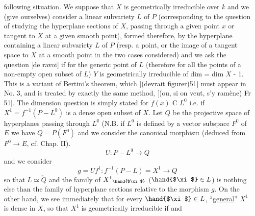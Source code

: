
following situation.  We suppose that $X$ is geometrically
irreducible over $k$ and we (give ourselves) consider a linear
subvariety $L$ of $P$ (corresponding to the question of studying the
hyperplane sections of $X$, passing through a given point $x$ or
tangent to $X$ at a given smooth point), formed therefore, by the
hyperplane containing a linear subvariety $L$ of $P$ (resp. a point,
or the image of a tangent space to $X$ at a smooth point in the two
cases considered) and we ask the question [de ravoi] if for the
generic point of $L$ (therefore for all the points of a non-empty
open subset of $L$) $Y$ is geometrically irreducible of dim = dim $X$ -
1.  This is a variant of Bertini's theorem, which [(devrait
figurer)51] must appear in No. 3, and is treated by exactly the
same method, [(ou, si on veut, s'y ramène) Fr 51].  The dimension
question is simply stated for $f(x)$ C $L^0$ i.e. if $X^1 = f^{-1}(P - L^0)$ is
a dense open subset of $X$.  Let $Q$ be the projective space of
hyperplanes passing through $L^0$ (N.B. if $L^0$ is defined by a vector
subspace $F^0$ of $E$ we have $Q = P(F^0)$ and we consider the canonical
morphism (deduced from $F^0 \to E$, cf.  Chap. II).
\[ U : \underline{P} - L^0 \to Q \]
and we consider
\[ g = Uf^1 : f^{-1}(P - L) = X^1 \to Q \]
so that $L \simeq \check{Q}$ and the family of $X^1{}_{\hand{$\xi$}}$ ($\hand{$\xi$} \in L$) is nothing else than
the family of hyperplane sections relative to the morphism $g$.  On
the other hand, we see immediately that for every $\hand{$\xi$}\in L$, ``\uline{general}''
$X^1$ is dense in $X$, so that $X^1$ is geometrically irreducible if and
